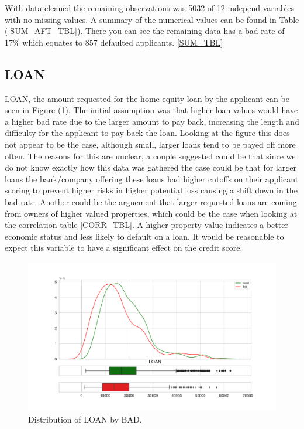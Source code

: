 With data cleaned the remaining observations was 5032 of 12 independ variables with no missing values. A summary of the numerical values can be found in Table (\ref{SUM_AFT_TBL}). There you can see the remaining data has a bad rate of 17\% which equates to 857 defaulted applicants. 
 \ref{SUM_TBL}

\subsection*{LOAN}

LOAN, the amount requested for the home equity loan by the applicant can be seen in Figure (\ref{loan_dist}). The initial assumption was that higher loan values would have a higher bad rate due to the larger amount to pay back, increasing the length and difficulty for the applicant to pay back the loan. Looking at the figure this does not appear to be the case, although small, larger loans tend to be payed off more often. The reasons for this are unclear, a couple suggested could be that since we do not know exactly how this data was gathered the case could be that for larger loans the bank/company offering these loans had higher cutoffs on their applicant scoring to prevent higher risks in higher potential loss causing a shift down in the bad rate. Another could be the arguement that larger requested loans are coming from owners of higher valued properties, which could be the case when looking at the correlation table \ref{CORR_TBL}. A higher property value indicates a better economic status and less likely to default on a loan. It would be reasonable to expect this variable to have a significant effect on the credit score.

\begin{figure}[!ht]
	\centering
	\includegraphics[scale=0.40]{figs/loan_dist.pdf}
	\caption{Distribution of LOAN by BAD. \label{loan_dist}}
\end{figure}

